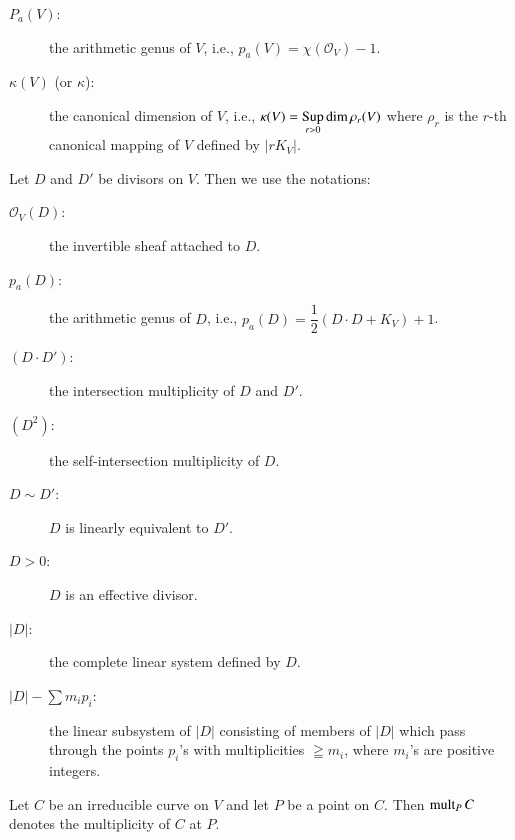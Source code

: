 \begin{enumerate}
\begin{description}
\item[$P_{a}(V)$:] the arithmetic genus of $V$, i.e.,
  $p_{a}(V)=\chi(\mathscr{O}_{V})-1$.

\item[$\kappa(V)$ (or $\kappa$):]  the canonical dimension of $V$,
  i.e., $\kappa(V)={\displaystyle{\mathop{\Sup}_{r>0}}} \dim\break
  \rho_{r}(V)$ where $\rho_{r}$ is the $r$-th canonical mapping of $V$
  defined by $|rK_{V}|$.
\end{description}

Let $D$ and $D'$ be divisors on $V$. Then we use the notations:

\medskip
\begin{description}
\item[$\mathscr{O}_{V}(D)$:] the invertible sheaf attached to $D$.

\item[$p_{a}(D)$:] the arithmetic genus of $D$, i.e.,
  $p_{a}(D)=\dfrac{1}{2}(D\cdot D+K_{V})+1$.

\item[$(D\cdot D')$:] the intersection multiplicity of $D$ and $D'$.

\item[$(D^{2})$:] the self-intersection multiplicity of $D$.

\item[$D\sim D'$:]  $D$ is linearly equivalent to $D'$.

\item[$D>0$:] $D$ is an effective divisor.

\item[$|D|$:] the complete linear system defined by $D$.

\item[$|D|-\sum m_{i}p_{i}$:] the linear subsystem of $|D|$ consisting of
  members of $|D|$ which pass through the points $p_{i}$'s with
  multiplicities $\geqq m_{i}$, where $m_{i}$'s are positive integers.
\end{description}

Let $C$ be an irreducible curve on $V$ and let $P$ be a point on
$C$. Then $\operatorname{mult}_{P}C$ denotes the multiplicity of $C$ at $P$.


\end{enumerate}
